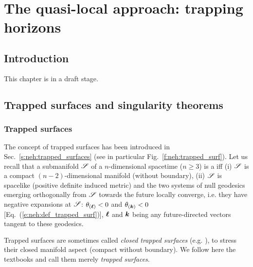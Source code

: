 \chapter{The quasi-local approach: trapping horizons}
\label{s:loc}

\minitoc

\section{Introduction}

This chapter is in a draft stage.

\section{Trapped surfaces and singularity theorems}

\subsection{Trapped surfaces} \label{s:loc:trapped_surf}

The concept of trapped surfaces has been introduced in Sec.~\ref{s:neh:trapped_surfaces}
(see in particular Fig.~\ref{f:neh:trapped_surf}). Let us recall that
a submanifold $\mathscr{S}$ of a $n$-dimensional spacetime ($n\ge 3$) is
a  iff (i) $\mathscr{S}$ is a compact $(n-2)$-dimensional manifold
(without boundary), (ii) $\mathscr{S}$ is spacelike (positive definite induced metric)
and the two systems of null geodesics emerging orthogonally from $\mathscr{S}$ towards the future
locally converge, i.e. they have negative expansions at $\mathscr{S}$:
$\theta_{(\bm{\ell})} < 0$ and $\theta_{(\bm{k})} < 0$ [Eq.~(\ref{e:neh:def_trapped_surf})],
$\bm{\ell}$ and $\bm{k}$ being
any future-directed vectors tangent to these geodesics.

\begin{remark}
Trapped surfaces are sometimes called
\emph{closed trapped surfaces} (e.g. \cite{Penro65,HawkiE73}),
to stress their closed manifold aspect (compact without boundary).
We follow here the textbooks \cite{MisneTW73,Wald84} and call them merely
\emph{trapped surfaces}.
\end{remark}

